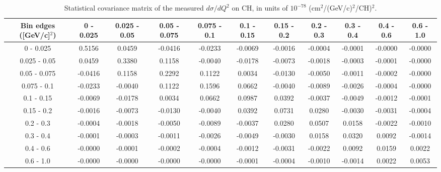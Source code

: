 \documentclass[aps,prl,twocolumn,superscriptaddress,nofootinbib]{revtex4-1}
\begin{document}
\begin{table}[h!]
  \centering
  \caption{Statistical covariance matrix of the measured $d\sigma/dQ^{2}$ on CH, in units of $10^{-78}$ (cm$^{2}$/(GeV/c)$^{2}$/CH)$^{2}$.}
    \begin{tabular}{c||cccccccccc}
      Bin edges ([GeV/c]$^{2}$) & 0 - 0.025 & 0.025 - 0.05 & 0.05 - 0.075 & 0.075 - 0.1 & 0.1 - 0.15 & 0.15 - 0.2 & 0.2 - 0.3 & 0.3 - 0.4 & 0.4 - 0.6 & 0.6 - 1.0 \\
\hline \hline
         0 - 0.025 &  0.5156 &  0.0459 & -0.0416 & -0.0233 & -0.0069 & -0.0016 & -0.0004 & -0.0001 & -0.0000 & -0.0000 \\
      0.025 - 0.05 &  0.0459 &  0.3380 &  0.1158 & -0.0040 & -0.0178 & -0.0073 & -0.0018 & -0.0003 & -0.0001 & -0.0000 \\
      0.05 - 0.075 & -0.0416 &  0.1158 &  0.2292 &  0.1122 &  0.0034 & -0.0130 & -0.0050 & -0.0011 & -0.0002 & -0.0000 \\
       0.075 - 0.1 & -0.0233 & -0.0040 &  0.1122 &  0.1596 &  0.0662 & -0.0040 & -0.0089 & -0.0026 & -0.0004 & -0.0000 \\
        0.1 - 0.15 & -0.0069 & -0.0178 &  0.0034 &  0.0662 &  0.0987 &  0.0392 & -0.0037 & -0.0049 & -0.0012 & -0.0001 \\
        0.15 - 0.2 & -0.0016 & -0.0073 & -0.0130 & -0.0040 &  0.0392 &  0.0731 &  0.0280 & -0.0030 & -0.0031 & -0.0004 \\
         0.2 - 0.3 & -0.0004 & -0.0018 & -0.0050 & -0.0089 & -0.0037 &  0.0280 &  0.0507 &  0.0158 & -0.0022 & -0.0010 \\
         0.3 - 0.4 & -0.0001 & -0.0003 & -0.0011 & -0.0026 & -0.0049 & -0.0030 &  0.0158 &  0.0320 &  0.0092 & -0.0014 \\
         0.4 - 0.6 & -0.0000 & -0.0001 & -0.0002 & -0.0004 & -0.0012 & -0.0031 & -0.0022 &  0.0092 &  0.0159 &  0.0022 \\
         0.6 - 1.0 & -0.0000 & -0.0000 & -0.0000 & -0.0000 & -0.0001 & -0.0004 & -0.0010 & -0.0014 &  0.0022 &  0.0053 \\
    \end{tabular}
  \label{tablecov:CH_Statistical_Q2}
\end{table}
\end{document}
